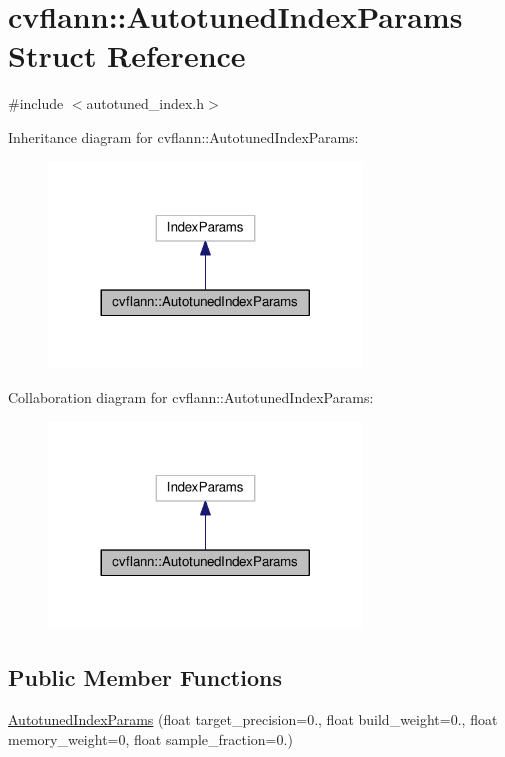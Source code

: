 \hypertarget{structcvflann_1_1AutotunedIndexParams}{\section{cvflann\-:\-:Autotuned\-Index\-Params Struct Reference}
\label{structcvflann_1_1AutotunedIndexParams}
}


{\ttfamily \#include $<$autotuned\-\_\-index.\-h$>$}



Inheritance diagram for cvflann\-:\-:Autotuned\-Index\-Params\-:\nopagebreak
\begin{figure}[H]
\begin{center}
\leavevmode
\includegraphics[width=236pt]{structcvflann_1_1AutotunedIndexParams__inherit__graph}
\end{center}
\end{figure}


Collaboration diagram for cvflann\-:\-:Autotuned\-Index\-Params\-:\nopagebreak
\begin{figure}[H]
\begin{center}
\leavevmode
\includegraphics[width=236pt]{structcvflann_1_1AutotunedIndexParams__coll__graph}
\end{center}
\end{figure}
\subsection*{Public Member Functions}
\begin{DoxyCompactItemize}
\item 
\hyperlink{structcvflann_1_1AutotunedIndexParams_ae36d84e1ea4a671b5dd698e46b944f4e}{Autotuned\-Index\-Params} (float target\-\_\-precision=0., float build\-\_\-weight=0., float memory\-\_\-weight=0, float sample\-\_\-fraction=0.)
\end{DoxyCompactItemize}


